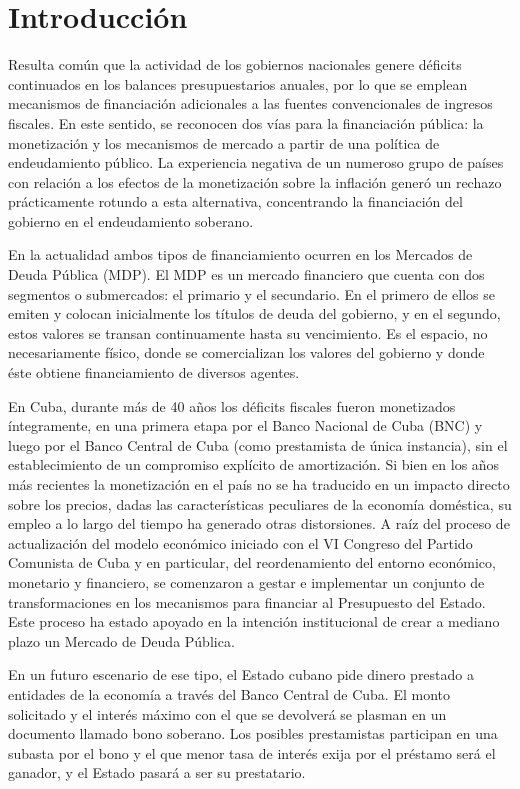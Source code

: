 \chapter*{Introducción}\label{chapter:introduction}

Resulta común que la actividad de los gobiernos nacionales genere déficits 
continuados en los balances presupuestarios anuales, por lo que se emplean mecanismos de financiación adicionales a las fuentes convencionales de 
ingresos fiscales. En este sentido, se reconocen dos vías para la financiación pública: 
la monetización  y los mecanismos de mercado a partir de una política de endeudamiento público. 
La experiencia negativa de un numeroso grupo de países con relación a los efectos de 
la monetización sobre la inflación generó un rechazo prácticamente rotundo a esta 
alternativa, concentrando la financiación del gobierno en el endeudamiento soberano. 

En la actualidad ambos tipos de financiamiento ocurren en los Mercados de Deuda 
Pública (MDP). 
El MDP es un mercado financiero que cuenta con dos segmentos o submercados: el 
primario y el secundario. En el primero de ellos se emiten y colocan inicialmente los 
títulos de deuda del gobierno, y en el segundo, estos valores se transan continuamente 
hasta su vencimiento. Es el espacio, no necesariamente físico, donde se comercializan 
los valores del gobierno y donde éste obtiene financiamiento de diversos agentes. 

En Cuba, durante más de 40 años los déficits fiscales fueron monetizados 
íntegramente, en una primera etapa por el Banco Nacional de Cuba (BNC) y luego por 
el Banco Central de Cuba (como prestamista de única instancia), sin el establecimiento 
de un compromiso explícito de amortización. 
Si bien en los años más recientes la monetización en el país no se ha traducido en un impacto directo sobre los precios, dadas las características peculiares de la economía 
doméstica, su empleo a lo largo del tiempo ha generado otras distorsiones. 
A raíz del proceso de actualización del modelo económico iniciado con el VI Congreso 
del Partido Comunista de Cuba y en particular, del reordenamiento del entorno económico, monetario y financiero, se comenzaron a gestar e implementar un conjunto de transformaciones en los mecanismos para financiar al Presupuesto del Estado. Este proceso ha estado apoyado en la intención institucional de crear a mediano plazo un Mercado de Deuda Pública. 

En un futuro escenario de ese tipo, el Estado cubano pide dinero prestado a entidades de la econom\'ia a trav\'es del Banco Central de Cuba. El monto solicitado y el inter\'es m\'aximo con el que se devolver\'a se plasman en un documento llamado bono soberano.  Los posibles prestamistas participan en una subasta por el bono y el que menor tasa de inter\'es exija por el pr\'estamo ser\'a el ganador, y el Estado pasar\'a a ser su prestatario.  

